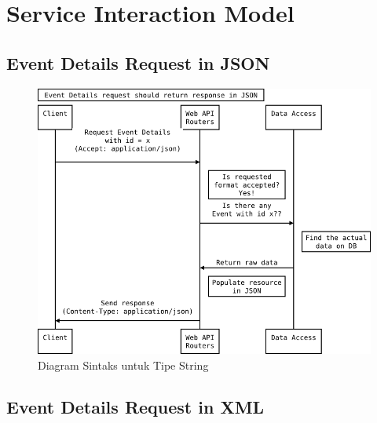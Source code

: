 \documentclass[a4paper, 12pt, oneside]{report}
\begin{document}
\section{Service Interaction Model}

\subsection{Event Details Request in JSON}

\begin{figure}[htp]
\centering
\includegraphics[scale=0.60]{images/event-details-request-seq-diagram-json.png}
\caption{Diagram Sintaks untuk Tipe String}
\label{event-details-requset-seq-diagram-json}
\end{figure}

\newpage

\subsection{Event Details Request in XML}
\end{document}

